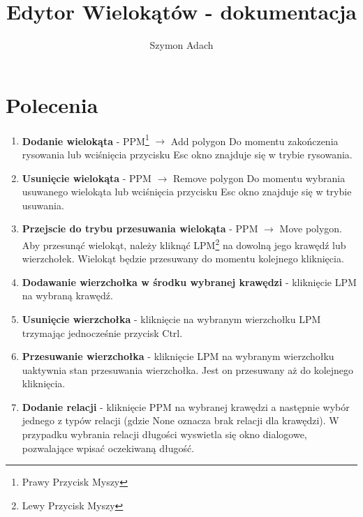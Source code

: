 \documentclass[]{article}
\title{Edytor Wielokątów - dokumentacja}
\author{Szymon Adach}
\begin{document}
\maketitle

\section{Polecenia}
\begin{enumerate}
	\item \textbf{Dodanie wielokąta} - PPM\footnote{Prawy Przycisk Myszy} $\rightarrow$ Add polygon \newline
	Do momentu zakończenia rysowania lub wciśnięcia przycisku Esc okno znajduje się w trybie rysowania.
	\item \textbf{Usunięcie wielokąta} - PPM $\rightarrow$ Remove polygon
	Do momentu wybrania usuwanego wielokąta lub wciśnięcia przycisku Esc okno znajduje się w trybie usuwania.
	\item \textbf{Przejscie do trybu przesuwania wielokąta} - PPM $\rightarrow$ Move polygon. \newline
	Aby przesunąć wielokąt, należy kliknąć LPM\footnote{Lewy Przycisk Myszy} na dowolną jego krawędź lub wierzchołek. Wielokąt będzie przesuwany do momentu kolejnego kliknięcia.
	\item \textbf{Dodawanie wierzchołka w środku wybranej krawędzi} - kliknięcie LPM na wybraną krawędź.
	\item \textbf{Usunięcie wierzchołka} - kliknięcie na wybranym wierzchołku LPM trzymając jednocześnie przycisk Ctrl.
	\item \textbf{Przesuwanie wierzchołka} - kliknięcie LPM na wybranym wierzchołku uaktywnia stan przesuwania wierzchołka. Jest on przesuwany aż do kolejnego kliknięcia.
	\item \textbf{Dodanie relacji} - kliknięcie PPM na wybranej krawędzi a następnie wybór jednego z typów relacji (gdzie None oznacza brak relacji dla krawędzi). W przypadku wybrania relacji długości wyswietla się okno dialogowe, pozwalające wpisać oczekiwaną długość.
\end{enumerate}
\end{document}
